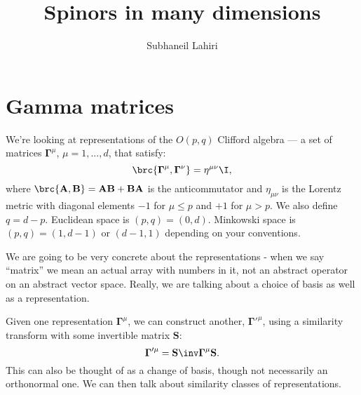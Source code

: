 \documentclass[11pt]{article}
\newcommand{\Gammab}{\boldsymbol{\Gamma}}
\renewcommand{\S}{\mathbf{S}}
\newcommand{\A}{\mathbf{A}}
\newcommand{\B}{\mathbf{B}}
\begin{document}
\title{Spinors in many dimensions}
\author{Subhaneil Lahiri}
\date{}
\maketitle
\tableofcontents
\section{Gamma matrices}\label{sec:clifford}

We're looking at representations of the \(O(p,q)\) Clifford algebra --- a set of matrices \(\Gammab^\mu\), \(\mu = 1, ..., d\), that satisfy:
%
\begin{equation}\label{eq:clifford}
  \brc{ \Gammab^\mu, \Gammab^\nu } = \eta^{\mu\nu} \I,
\end{equation}
%
where \(\brc{ \A, \B } = \A\B + \B\A\) is the anticommutator and \(\eta_{\mu\nu}\) is the Lorentz metric with diagonal elements \(-1\) for \(\mu \leq p\) and \(+1\) for \(\mu > p\). We also define \(q = d - p\).
Euclidean space is \( (p,q) = (0,d) \).
Minkowski space is \( (p,q) = (1,d-1) \) or \( (d-1,1) \) depending on your conventions.

We are going to be very concrete about the representations - when we say ``matrix'' we mean an actual array with numbers in it, not an abstract operator on an abstract vector space.
Really, we are talking about a choice of basis as well as a representation.

Given one representation \(\Gammab^\mu\), we can construct another, \(\Gammab'^{\mu}\), using a similarity transform with some invertible matrix \(\S\):
%
\begin{equation}\label{eq:similarity}
  \Gammab'^{\mu} = \S\inv \Gammab^\mu \S.
\end{equation}
%
This can also be thought of as a change of basis, though not necessarily an orthonormal one.
We can then talk about similarity classes of representations.
\end{document}
